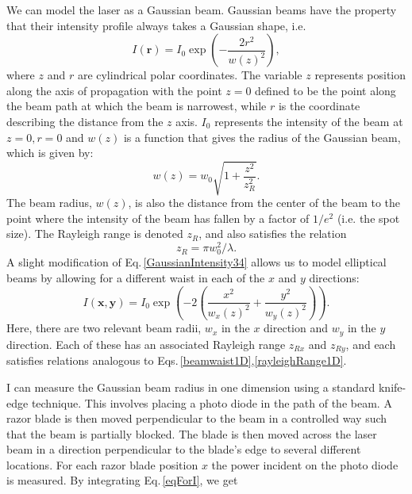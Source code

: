 We can model the laser as a Gaussian beam. Gaussian beams have the property that their intensity profile always takes a Gaussian shape, i.e. \cite{lasersMilonniEberly}
\begin{equation}
\label{GaussianIntensity34}
    I(\mathbf{r})=I_0\exp\left(-\frac{2r^2}{w(z)^2}\right),
\end{equation}
where $z$ and $r$ are cylindrical polar coordinates. The variable $z$ represents position along the axis of propagation with the point $z=0$ defined to be the point along the beam path at which the beam is narrowest, while $r$ is the coordinate describing the distance from the $z$ axis. $I_0$ represents the intensity of the beam at $z=0, r=0$ and $w(z)$ is a function that gives the radius of the Gaussian beam, which is given by:
\begin{equation}
w(z)=w_0\sqrt{1+\frac{z^2}{z_R^2}}\label{beamwaist1D}.
\end{equation}
The beam radius, $w(z)$, is also the distance from the center of the beam to the point where the intensity of the beam has fallen by a factor of $1/e^2$ (i.e. the spot size). The Rayleigh range is denoted $z_R$, and also satisfies the relation 
\begin{equation}
z_R=\pi w_0^2/\lambda \label{rayleighRange1D}.
\end{equation}
A slight modification of Eq.\,\ref{GaussianIntensity34} allows us to model elliptical beams by allowing for a different waist in each of the $x$ and $y$ directions:
\begin{equation}\label{eqForI}
    I(\mathbf{x,y})=I_0\exp\left(-2\left(\frac{x^2}{w_x(z)^2}+\frac{y^2}{w_y(z)^2}\right)\right).
\end{equation}
Here, there are two relevant beam radii, $w_x$ in the $x$ direction and $w_y$ in the $y$ direction. Each of these has an associated Rayleigh range $z_{Rx}$ and $z_{Ry}$, and each satisfies relations analogous to Eqs.\,\ref{beamwaist1D},\ref{rayleighRange1D}.

I can measure the Gaussian beam radius in one dimension using a standard knife-edge technique. This involves placing a photo diode in the path of the beam. A razor blade is then moved perpendicular to the beam in a controlled way such that the beam is partially blocked. The blade is then moved across the laser beam in a direction perpendicular to the blade's edge to several different locations. For each razor blade position $x$ the power incident on the photo diode is measured. By integrating Eq.\,\ref{eqForI}, we get

